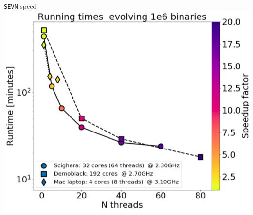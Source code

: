 \documentclass{beamer} %
\begin{document}
\begin{frame}[noframenumbering]{\texttt{SEVN} speed}
	\centering
	\includegraphics[width=.7\textwidth]{./images/SEVN.png}
\end{frame}
\end{document}
